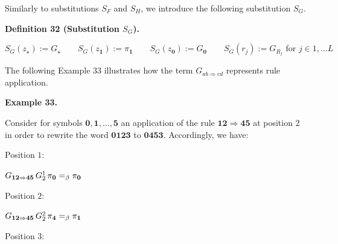 \documentclass[10pt,a4paper]{amsart}
\begin{document}
 
 
Similarly to substitutions $S_{F}$ and $S_{H}$, we introduce the following substitution $S_{G}$.\par
 
 
 
\par\medskip\noindent\textbf{Definition 32 (Substitution $S_{G}$).}\par
 
 
\par
    \[S_{G}(z_{\star}):=G_{\star}\qquad S_{G}(z_{\mathbf{1}}):=\pi_{\mathbf{1}}%
\qquad S_{G}(z_{\mathbf{0}}):=G_{\mathbf{0}}\qquad S_{G}(r_{j}):=G_{R_{j}}%
\text{ for }j\in{1,\ldots L}\]    
 
 
 
The following Example 33 illustrates how the term $G_{ab\Rightarrow cd}$ represents rule application.\par
 
 
 
\par\medskip\noindent\textbf{Example 33.}\par
 
 
Consider for symbols $\mathbf{0},\mathbf{1},\ldots,\mathbf{5}$ an application of the rule $\mathbf{1}\mathbf{2}\Rightarrow\mathbf{4}\mathbf{5}$ at position $2$ in order to rewrite the word $\mathbf{0}\mathbf{1}\mathbf{2}\mathbf{3}$ to $\mathbf{0}\mathbf{4}\mathbf{5}\mathbf{3}$. Accordingly, we have:\par
  Position $1$:  
 
$G_{\mathbf{1}\mathbf{2}\Rightarrow\mathbf{4}\mathbf{5}}\,G_{2}^{1}\,\pi_{%
\mathbf{0}}=_{\beta}\pi_{\mathbf{0}}$\par
 
  Position $2$:  
 
$G_{\mathbf{1}\mathbf{2}\Rightarrow\mathbf{4}\mathbf{5}}\,G_{2}^{2}\,\pi_{%
\mathbf{4}}=_{\beta}\pi_{\mathbf{1}}$\par
 
  Position $3$:  
 
\end{document}
